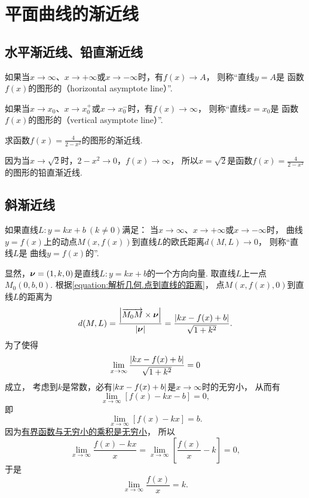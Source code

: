 \section{平面曲线的渐近线}
\subsection{水平渐近线、铅直渐近线}
如果当\(x\to\infty\)、\(x\to+\infty\)或\(x\to-\infty\)时，有\(f(x) \to A\)，
则称“直线\(y = A\)是
函数\(f(x)\)的图形的（horizontal asymptote line）”.

如果当\(x \to x_0\)、\(x \to x_0^+\)或\(x \to x_0^-\)时，有\(f(x) \to \infty\)，
则称“直线\(x = x_0\)是
函数\(f(x)\)的图形的（vertical asymptote line）”.

\begin{example}
求函数\(f(x)=\frac4{2-x^2}\)的图形的渐近线.
\begin{solution}
因为当\(x\to\sqrt2\)时，\(2-x^2\to0\)，\(f(x)\to\infty\)，
所以\(x=\sqrt2\)是函数\(f(x)=\frac4{2-x^2}\)的图形的铅直渐近线.
\end{solution}
\end{example}

\subsection{斜渐近线}
如果直线\(L: y = kx+b\ (k \neq 0)\)满足：
当\(x\to\infty\)、\(x\to+\infty\)或\(x\to-\infty\)时，
曲线\(y = f(x)\)上的动点\(M(x,f(x))\)到直线\(L\)的欧氏距离\(d(M,L)\to0\)，
则称“直线\(L\)是
曲线\(y = f(x)\)的”.

显然，\(\boldsymbol{\nu}=(1,k,0)\)是直线\(L: y=kx+b\)的一个方向向量.
取直线\(L\)上一点\(M_0(0,b,0)\).
根据\cref{equation:解析几何.点到直线的距离}，
点\(M(x,f(x),0)\)到直线\(L\)的距离为\[
	d(M,L)=\frac{\abs{\overrightarrow{M_0M}\times\boldsymbol{\nu}}}{\abs{\boldsymbol{\nu}}}
	=\frac{
		\abs{kx-f(x)+b}
	}{
		\sqrt{1+k^2}
	}.
\]
为了使得\[
	\lim_{x\to\infty} \frac{\abs{kx-f(x)+b}}{\sqrt{1+k^2}} = 0
\]成立，
考虑到\(k\)是常数，必有\(\abs{kx-f(x)+b}\)是\(x\to\infty\)时的无穷小，
从而有\[
	\lim_{x\to\infty} [f(x)-kx-b] = 0,
\]
即\[
	\lim_{x\to\infty} [f(x)-kx] = b.
\]
因为\hyperref[theorem:函数极限.无穷小.有界函数与无穷小的乘积是无穷小]{有界函数与无穷小的乘积是无穷小}，
所以\[
	\lim_{x\to\infty} \frac{f(x)-kx}{x}
	= \lim_{x\to\infty} \left[\frac{f(x)}x-k\right]
	= 0,
\]
于是\[
	\lim_{x\to\infty} \frac{f(x)}{x} = k.
\]

